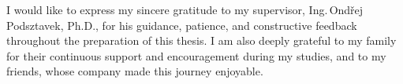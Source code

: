 \documentclass[english,bachelor,oneside]{ctufit-thesis}
\begin{document}
\frontmatter\frontmatterinit %

\thispagestyle{empty}\maketitle\thispagestyle{empty}\cleardoublepage %


\imprintpage %
\stopTOCentries

\begin{acknowledgmentpage}
      I would like to express my sincere gratitude to my supervisor,
      Ing.\,Ondřej Podsztavek, Ph.D., for his guidance, patience, and
      constructive feedback throughout the preparation of this thesis.
      I am also deeply grateful to my family for their continuous
      support and encouragement during my studies, and to my friends,
      whose company made this journey enjoyable.
  \end{acknowledgmentpage}
\end{document}
